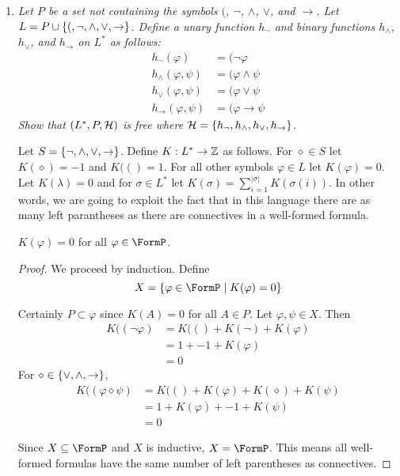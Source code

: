 \documentclass[10pt]{article}
\begin{document}
\begin{enumerate}
\item \emph{Let $P$ be a set not containing the symbols $($, $\neg$, $\land$, $\lor$, and $\to$.  Let $L = P \cup \set{(, \neg, \land, \lor, \to}$.  Define a unary function $h_{\neg}$ and binary functions $h_{\land}$, $h_{\lor}$, and $h_{\to}$ on $L^\ast$ as follows: \begin{align*}h_{\neg}(\varphi) &= (\neg \varphi \\ h_{\land}(\varphi, \psi) &= (\varphi \land \psi \\ h_{\lor}(\varphi, \psi) &= ( \varphi \lor \psi \\ h_{\to}(\varphi, \psi) &= (\varphi \to \psi\end{align*} Show that $(L^\ast, P, \cal{H})$ is free where $\cal{H} = \set{h_{\neg}, h_{\land}, h_{\lor}, h_{\to}}$.}

Let $S = \set{\neg, \land, \lor, \to}$.  Define $K: L^\ast \to \Z$ as follows.  For $\diamond \in S$ let $K(\diamond) = -1$ and $K(() = 1$.  For all other symbols $\varphi \in L$ let $K(\varphi) = 0$.  Let $K(\lambda) = 0$ and for $\sigma \in L^\ast$ let $K(\sigma) = \sum_{i=1}^{|\sigma|} K(\sigma(i))$.  In other words, we are going to exploit the fact that in this language there are as many left parantheses as there are connectives in a well-formed formula.

\begin{lemma}$K(\varphi) = 0$ for all $\varphi \in \FormP$.
\end{lemma}

\begin{proof}
We proceed by induction.  Define 
\[
X = \set{\varphi \in \FormP \mid K(\varphi) = 0}
\]

Certainly $P \subset \varphi$ since $K(A) = 0$ for all $A \in P$.  Let $\varphi, \psi \in X$.  Then
\begin{align*}
K((\neg \varphi) &= K(() + K(\neg) + K(\varphi) \\
&= 1 + -1 + K(\varphi) \\
&= 0
\end{align*}
For $\diamond \in \set{\lor, \land, \to}$,
\begin{align*}
K((\varphi \diamond \psi) &= K(() + K(\varphi) + K(\diamond) + K(\psi) \\
&= 1 + K(\varphi) + -1 + K(\psi) \\
&= 0
\end{align*}

Since $X \subseteq \FormP$ and $X$ is inductive, $X = \FormP$.  This means all well-formed formulas have the same number of left parentheses as connectives.
\end{proof}


\end{enumerate}
\end{document}
